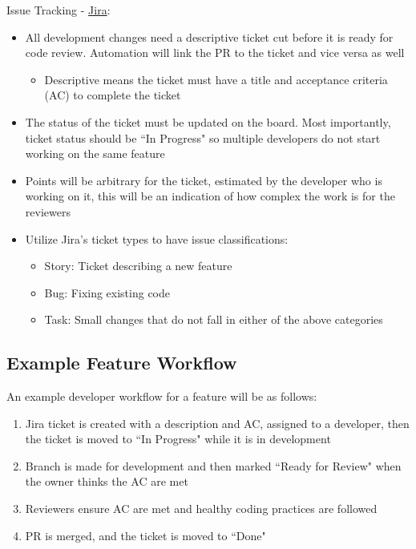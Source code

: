 \documentclass{article}
\begin{document}
Issue Tracking - \href{https://flickpicker.atlassian.net/jira/software/projects/CAP/boards/1}{Jira}: 
\begin{itemize}
	\item All development changes need a descriptive ticket cut before it is ready for code review. Automation will link the PR to the ticket and vice versa as well
	\begin{itemize}
		\item Descriptive means the ticket must have a title and acceptance criteria (AC) to complete the ticket
	\end{itemize}
	\item The status of the ticket must be updated on the board. Most importantly, ticket status should be ``In Progress" so multiple developers do not start working on the same feature
	\item Points will be arbitrary for the ticket, estimated by the developer who is working on it, this will be an indication of how complex the work is for the reviewers
	\item Utilize Jira's ticket types to have issue classifications:
	\begin{itemize}
		\item Story: Ticket describing a new feature
		\item Bug: Fixing existing code
		\item Task: Small changes that do not fall in either of the above categories
	\end{itemize}
\end{itemize}

\subsection{Example Feature Workflow}
An example developer workflow for a feature will be as follows:
\begin{enumerate}
	\item Jira ticket is created with a description and AC, assigned to a developer, then the ticket is moved to ``In Progress" while it is in development
	\item Branch is made for development and then marked ``Ready for Review" when the owner thinks the AC are met
	\item Reviewers ensure AC are met and healthy coding practices are followed
	\item PR is merged, and the ticket is moved to ``Done"
\end{enumerate}
\end{document}

